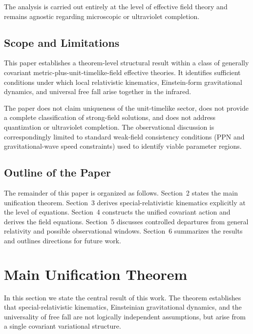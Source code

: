 \documentclass[11pt]{article}
\begin{document}
            The analysis is carried out entirely at the level of effective field theory and
            remains agnostic regarding microscopic or ultraviolet completion.

        \subsection{Scope and Limitations}

            This paper establishes a theorem-level structural result within a class of
            generally covariant metric-plus-unit-timelike-field effective theories.
            It identifies sufficient conditions under which local relativistic kinematics,
            Einstein-form gravitational dynamics, and universal free fall arise together in
            the infrared.

            The paper does not claim uniqueness of the unit-timelike sector, does not provide
            a complete classification of strong-field solutions, and does not address
            quantization or ultraviolet completion.
            The observational discussion is correspondingly limited to standard weak-field
            consistency conditions (PPN and gravitational-wave speed constraints) used to
            identify viable parameter regions.

        \subsection{Outline of the Paper}

            The remainder of this paper is organized as follows.
            Section~2 states the main unification theorem.
            Section~3 derives special-relativistic kinematics explicitly at the level of
            equations.
            Section~4 constructs the unified covariant action and derives the field
            equations.
            Section~5 discusses controlled departures from general relativity and possible
            observational windows.
            Section~6 summarizes the results and outlines directions for future work.

    \section{Main Unification Theorem}
        \label{sec:theorem}

        In this section we state the central result of this work.
        The theorem establishes that special-relativistic kinematics, Einsteinian
        gravitational dynamics, and the universality of free fall are not logically
        independent assumptions, but arise from a single covariant variational
        structure.
\end{document}
